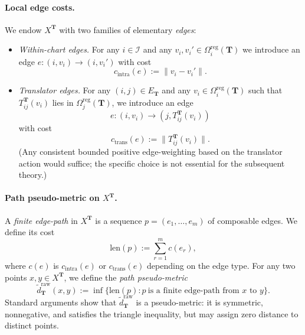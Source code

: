 \documentclass[11pt]{article}
\begin{document}
\paragraph{Local edge costs.}
We endow $X^{\mathbf{T}}$ with two families of elementary \emph{edges}:
\begin{itemize}
  \item \emph{Within-chart edges.} For any $i \in \mathcal{I}$ and any
        $v_i, v_i' \in \Omega_i^{\mathrm{reg}}(\mathbf{T})$ we introduce
        an edge $e : (i, v_i) \to (i, v_i')$ with cost
        \[
        c_{\mathrm{intra}}(e)
        :=
        \|v_i - v_i'\|.
        \]
  \item \emph{Translator edges.} For any $(i,j) \in E_{\mathbf{T}}$ and
        any $v_i \in \Omega_i^{\mathrm{reg}}(\mathbf{T})$ such that
        $T_{ij}^{\mathbf{T}}(v_i)$ lies in $\Omega_j^{\mathrm{reg}}(\mathbf{T})$,
        we introduce an edge
        \[
        e : (i, v_i) \longrightarrow (j, T_{ij}^{\mathbf{T}}(v_i))
        \]
        with cost
        \[
        c_{\mathrm{trans}}(e)
        :=
        \bigl\| T_{ij}^{\mathbf{T}}(v_i) \bigr\|.
        \]
        (Any consistent bounded positive edge-weighting based on the
        translator action would suffice; the specific choice is not
        essential for the subsequent theory.)
\end{itemize}

\paragraph{Path pseudo-metric on $X^{\mathbf{T}}$.}
A \emph{finite edge-path} in $X^{\mathbf{T}}$ is a sequence
$p = (e_1, \dots, e_m)$ of composable edges.
We define its cost
\[
\mathrm{len}(p)
:=
\sum_{r=1}^m c(e_r),
\]
where $c(e)$ is $c_{\mathrm{intra}}(e)$ or $c_{\mathrm{trans}}(e)$
depending on the edge type.
For any two points $x,y \in X^{\mathbf{T}}$, we define the
\emph{path pseudo-metric}
\[
\tilde d_{\mathbf{T}}^{\mathrm{raw}}(x,y)
:=
\inf\bigl\{ \mathrm{len}(p) : p\ \text{is a finite edge-path from $x$ to $y$} \bigr\}.
\]
Standard arguments show that $\tilde d_{\mathbf{T}}^{\mathrm{raw}}$ is a
pseudo-metric: it is symmetric, nonnegative, and satisfies the triangle
inequality, but may assign zero distance to distinct points.
\end{document}
